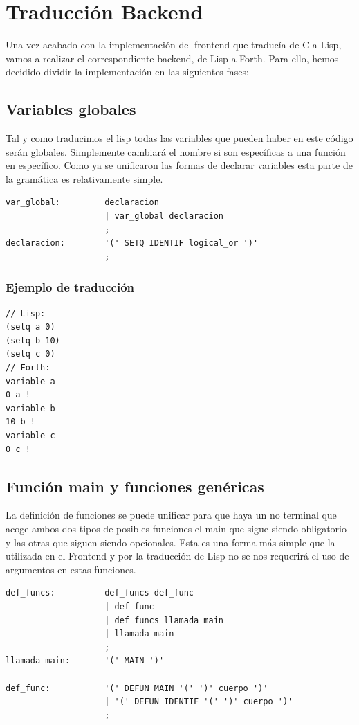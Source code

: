 \documentclass[12pt,a4paper]{article}
\begin{document}
\section{Traducción Backend}
\noindent Una vez acabado con la implementación del frontend que traducía de C a Lisp, vamos a 
realizar el correspondiente backend, de Lisp a Forth. Para ello, hemos decidido dividir la 
implementación en las siguientes fases:
\subsection{Variables globales}
\noindent Tal y como traducimos el lisp todas las variables que pueden haber en este código serán 
globales. Simplemente cambiará el nombre si son específicas a una función en específico. Como ya 
se unificaron las formas de declarar variables esta parte de la gramática es relativamente simple.
\begin{lstlisting}
var_global:         declaracion                                                        
                    | var_global declaracion
                    ;                               
declaracion:        '(' SETQ IDENTIF logical_or ')'
                    ; 
\end{lstlisting}
\subsubsection{Ejemplo de traducción}
\begin{lstlisting}
// Lisp:
(setq a 0)
(setq b 10)
(setq c 0)
// Forth:
variable a
0 a !
variable b
10 b !
variable c
0 c !
\end{lstlisting}
\subsection{Función main y funciones genéricas}
\noindent La definición de funciones se puede unificar para que haya un no terminal que acoge ambos 
dos tipos de posibles funciones el main que sigue siendo obligatorio y las otras que siguen siendo 
opcionales. Esta es una forma más simple que la utilizada en el Frontend y por la traducción de Lisp 
no se nos requerirá el uso de argumentos en estas funciones.
\begin{lstlisting}
def_funcs:          def_funcs def_func                
                    | def_func                                                         
                    | def_funcs llamada_main       
                    | llamada_main                                                      
                    ;
llamada_main:       '(' MAIN ')'

def_func:           '(' DEFUN MAIN '(' ')' cuerpo ')'
                    | '(' DEFUN IDENTIF '(' ')' cuerpo ')'
                    ;  
\end{lstlisting}
\end{document}
